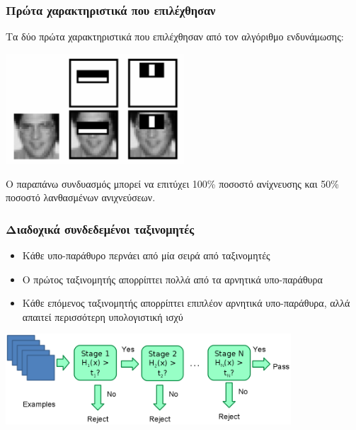 \documentclass{beamer}
\begin{document}
\begin{frame}
\frametitle{Πρώτα χαρακτηριστικά που επιλέχθησαν}
Τα δύο πρώτα χαρακτηριστικά που επιλέχθησαν από τον αλγόριθμο ενδυνάμωσης:

\begin{center}
\includegraphics[width=0.5\textwidth]{images/feature-selection}
\end{center}

Ο παραπάνω συνδυασμός μπορεί να επιτύχει 100\% ποσοστό ανίχνευσης και 50\%
ποσοστό λανθασμένων ανιχνεύσεων.
\end{frame}

\begin{frame}
\frametitle{Διαδοχικά συνδεδεμένοι ταξινομητές}
\begin{itemize}
\item Κάθε υπο-παράθυρο περνάει από μία σειρά από ταξινομητές
\item Ο πρώτος ταξινομητής απορρίπτει πολλά από τα αρνητικά υπο-παράθυρα
\item Κάθε επόμενος ταξινομητής απορρίπτει επιπλέον αρνητικά υπο-παράθυρα, αλλά
απαιτεί περισσότερη υπολογιστική ισχύ
\end{itemize}

\begin{center}
\includegraphics[width=0.8\textwidth]{images/cascade}
\end{center}
\end{frame}
\end{document}
